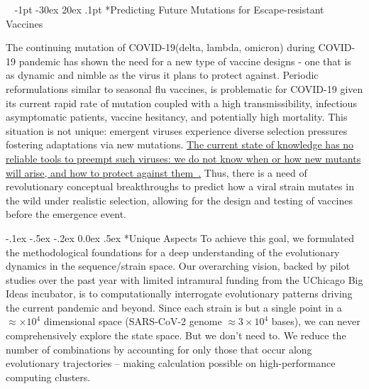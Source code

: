 \documentclass[onecolumn, compsoc,12pt]{IEEEtran}
\makeatletter
\renewcommand\section{\@startsection {section}{1}{\z@}%
                                   {-1pt \@plus -30ex \@minus 20ex}%
                                   {.1pt}%
                                   {\large\bfseries\scshape}}
\renewcommand\paragraph{\@startsection {section}{1}{\z@}%
                                   {-.1ex \@plus -.5ex \@minus -.2ex}%
                                   {0.0ex \@plus.5ex}%
                                   {\fontsize{11}{10}\selectfont\bfseries\itshape\sffamily\color{black}}}
\def\hcov{SARS-CoV-2\xspace}
\def\cov{COVID-19\xspace}
\makeatother
\begin{document}
 

\vspace{20pt}



\clearpage
\setcounter{page}{1}


$\phantom{x}$
\vspace{-35pt}  
\section*{Predicting Future Mutations for  Escape-resistant Vaccines}


The continuing mutation of \cov (delta, lambda, omicron) during \cov pandemic  has shown the need for a new type of vaccine designs - one that is as dynamic and nimble as the virus it plans to protect against. Periodic reformulations similar to  seasonal  flu vaccines,  is  problematic for \cov given its current rapid rate of mutation coupled with a high transmissibility, infectious asymptomatic patients, vaccine hesitancy, and potentially high mortality. This situation is not unique: emergent viruses experience diverse  selection pressures fostering  adaptations via new mutations. \uline{The current state of knowledge has no reliable tools to preempt such viruses: we do not know when or how new mutants will arise, and how to protect against them~\cite{gou2020systematic}\cite{fair2019viral}.} 
Thus, there is a need of revolutionary conceptual  breakthroughs to predict how a viral strain  mutates in the wild under realistic selection, allowing for the design and testing of vaccines before the emergence event.

\paragraph*{Unique Aspects} To achieve this goal, we formulated the methodological foundations for a deep understanding of the evolutionary dynamics  in  the sequence/strain space. Our overarching vision, backed by pilot studies over the past year with limited intramural  funding from the UChicago Big Ideas  incubator, is to  computationally interrogate  evolutionary patterns driving  the current  pandemic and beyond. Since each  strain is but a single point in a  $\approx  \times10^4$ dimensional space (\hcov genome  $\approx 3 \times 10^4$ bases), we can never comprehensively explore the  state space. But we don't need to. We reduce the number of combinations by accounting for only those that occur along evolutionary trajectories – making calculation possible on high-performance computing clusters.
\end{document}
